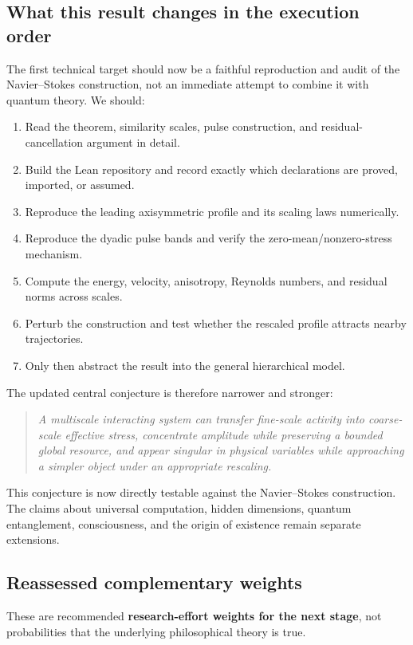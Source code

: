 \documentclass[11pt]{article}
\theoremstyle{definition}
\theoremstyle{plain}
\theoremstyle{remark}
\begin{document}
\subsection{What this result changes in the execution order}

The first technical target should now be a faithful reproduction and audit of the Navier--Stokes construction, not an immediate attempt to combine it with quantum theory. We should:
\begin{enumerate}
  \item Read the theorem, similarity scales, pulse construction, and residual-cancellation argument in detail.
  \item Build the Lean repository and record exactly which declarations are proved, imported, or assumed.
  \item Reproduce the leading axisymmetric profile and its scaling laws numerically.
  \item Reproduce the dyadic pulse bands and verify the zero-mean/nonzero-stress mechanism.
  \item Compute the energy, velocity, anisotropy, Reynolds numbers, and residual norms across scales.
  \item Perturb the construction and test whether the rescaled profile attracts nearby trajectories.
  \item Only then abstract the result into the general hierarchical model.
\end{enumerate}

The updated central conjecture is therefore narrower and stronger:
\begin{quote}
  \emph{A multiscale interacting system can transfer fine-scale activity into coarse-scale effective stress, concentrate amplitude while preserving a bounded global resource, and appear singular in physical variables while approaching a simpler object under an appropriate rescaling.}
\end{quote}

This conjecture is now directly testable against the Navier--Stokes construction. The claims about universal computation, hidden dimensions, quantum entanglement, consciousness, and the origin of existence remain separate extensions.

\subsection{Reassessed complementary weights}

These are recommended \textbf{research-effort weights for the next stage}, not probabilities that the underlying philosophical theory is true.
\end{document}
